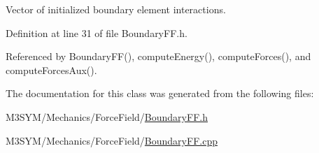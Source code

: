 Vector of initialized boundary element interactions. 



Definition at line 31 of file Boundary\+F\+F.\+h.



Referenced by Boundary\+F\+F(), compute\+Energy(), compute\+Forces(), and compute\+Forces\+Aux().



The documentation for this class was generated from the following files\+:\begin{DoxyCompactItemize}
\item 
M3\+S\+Y\+M/\+Mechanics/\+Force\+Field/\hyperlink{BoundaryFF_8h}{Boundary\+F\+F.\+h}\item 
M3\+S\+Y\+M/\+Mechanics/\+Force\+Field/\hyperlink{BoundaryFF_8cpp}{Boundary\+F\+F.\+cpp}\end{DoxyCompactItemize}
